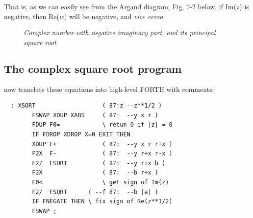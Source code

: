 That is, as we can easily see from the Argand diagram, Fig. 7-2 below, if Im($z$) is negative, then Re($w$) will be negative, and \textit{vice versa}.

\begin{figure}
    \caption{\textit{Complex number with negative imaginary part, and its principal square root}}
    \label{fig:07_02}
\end{figure}

\subsection{The complex square root program}
 now translate these equations into high-level FORTH with comments:

\begin{lstlisting}
  : XSORT                   ( 87:z --z**1/2 )
        FSWAP XDUP XABS     ( 87:  --y x r )
        FDUP F0=            \ retun 0 if |z| = 0
        IF FDROP XDROP X=0 EXIT THEN
        XDUP F+             ( 87:  --y x r r+x )
        F2X  F-             ( 87:  --y r+x r-x )
        F2/  FSORT          ( 87:  --y r+x b )
        F2X                 ( 87:  --b r+x )
        F0<                 \ get sign of Im(z)
        F2/  FSQRT      ( --f 87:  --b |a| )
        IF FNEGATE THEN \ fix sign of Re(z**1/2)
        FSWAP ;
\end{lstlisting}

